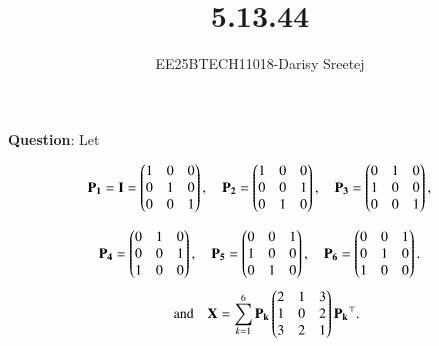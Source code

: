 \documentclass[journal]{IEEEtran}
\begin{document}

\vspace{3cm}

\title{5.13.44}
\author{EE25BTECH11018-Darisy Sreetej}
 \maketitle
{\let\newpage\relax\maketitle}

\renewcommand{\thefigure}{\theenumi}
\renewcommand{\thetable}{\theenumi}
\setlength{\intextsep}{10pt} %


\renewcommand{\thetable}{\theenumi}

\textbf{Question}:
Let  

$$
\mathbf{\mathbf{P_1}} = \mathbf{I} = 
\begin{pmatrix}1 & 0 & 0 \\ 0 & 1 & 0 \\ 0 & 0 & 1\end{pmatrix}, \quad
\mathbf{\mathbf{P_2}} = 
\begin{pmatrix}1 & 0 & 0 \\ 0 & 0 & 1 \\ 0 & 1 & 0\end{pmatrix}, \quad
\mathbf{\mathbf{P_3}} = 
\begin{pmatrix}0 & 1 & 0 \\ 1 & 0 & 0 \\ 0 & 0 & 1\end{pmatrix},
$$

$$
\mathbf{\mathbf{P_4}} = 
\begin{pmatrix}0 & 1 & 0 \\ 0 & 0 & 1 \\ 1 & 0 & 0\end{pmatrix}, \quad
\mathbf{\mathbf{P_5}} = 
\begin{pmatrix}0 & 0 & 1 \\ 1 & 0 & 0 \\ 0 & 1 & 0\end{pmatrix}, \quad
\mathbf{\mathbf{P_6}} = 
\begin{pmatrix}0 & 0 & 1 \\ 0 & 1 & 0 \\ 1 & 0 & 0\end{pmatrix}.
$$
$$
\quad \text{and} \quad
\mathbf{X} = \sum_{k=1}^{6} \mathbf{P_k} \begin{pmatrix}2 & 1 & 3 \\ 1 & 0 & 2 \\ 3 & 2 & 1\end{pmatrix} \mathbf{P_k}^\top.
$$
\end{document}
